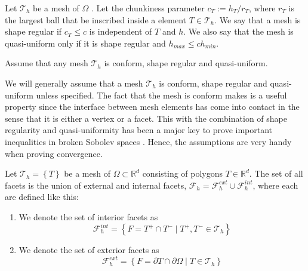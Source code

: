 \begin{definition}
Let $\mathcal{T}_{h} $ be a mesh of $\Omega $ .
Let the chunkiness parameter $c_{T} := h_{T}/r_{T}$, where $r_{T}$  is the largest ball that be inscribed inside a element $T \in \mathcal{T}_{h} $.
We say that a mesh is shape regular if $c_{T}\le  c$ is independent of $T$  and $h$. We also say that the mesh is quasi-uniform only if it is shape regular and $h_{max} \le  c h_{min}$.
\end{definition}

\begin{assumption}
Assume that any mesh $\mathcal{T}_{h} $ is conform, shape regular and quasi-uniform.
\end{assumption}
We will generally assume that a mesh $\mathcal{T}_{h} $ is conform, shape regular and quasi-uniform unless specified.
 The fact that the mesh is conform makes is a useful property since the interface between mesh elements has come into contact in the sense
that it is either a vertex or a facet. This with the combination of shape regularity and quasi-uniformity has been a major key to prove important inequalities in broken Sobolev spaces \cite[Chapter 1.4.1]{pietro2012}. Hence, the assumptions are
very handy when proving convergence.

\begin{definition}[Facets]
Let $\mathcal{T}_{h}  = \left\{ T \right\} $ be a mesh of $\Omega \subset  \mathbb{R} ^d $ consisting of polygons $T \in \mathbb{R} ^{d}$.
The set of all facets is the union of external and internal facets, $\mathcal{F} _{h} = \mathcal{F} ^{ext}_{h} \cup \mathcal{F} _{h}^{int} $, where each are defined like this:
\begin{enumerate}[label=\arabic*)]
    \item We denote the set of interior facets as \[
            \mathcal{F}^{int} _{h} = \left\{ F=T^{+}\cap T^{-}  \mid  T^{+}, T^{-} \in \mathcal{T}_{h}  \right\}
\]
\item We denote the set of exterior facets as
\[
            \mathcal{F}^{ext} _{h} = \left\{ F= \partial T \cap \partial \Omega    \mid  T  \in \mathcal{T}_{h}  \right\}
\]
\end{enumerate}
\end{definition}


